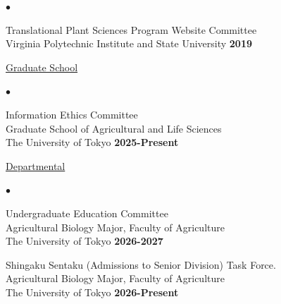 \documentclass[margin,line,10pt]{res}
\newenvironment{list2}{
  \begin{list}{$\bullet$}{%
      \setlength{\itemsep}{0in}
      \setlength{\parsep}{0in} \setlength{\parskip}{0in}
      \setlength{\topsep}{0in} \setlength{\partopsep}{0in} 
      \setlength{\leftmargin}{0.2in}}}{\end{list}}
\begin{document}
\begin{resume}
\begin{list2}
\item Translational Plant Sciences Program Website Committee \\
  Virginia Polytechnic Institute and State University  \hfill \textbf{2019}\\

  
\end{list2}

  
\begin{flushleft}
  \hspace{0.3cm} \underline{Graduate School}
\end{flushleft}
\begin{list2}

  \item  Information Ethics Committee   \\ %
  Graduate School of Agricultural and Life Sciences  \\ The University of Tokyo   \hfill \textbf{2025-Present}\\


\end{list2}
  

\begin{flushleft}
  \hspace{0.3cm} \underline{Departmental}
\end{flushleft}
\begin{list2}


  \item Undergraduate Education Committee \\ %
  Agricultural Biology Major, Faculty of Agriculture  \\ The University of Tokyo   \hfill \textbf{2026-2027}\\

  \vspace{0.3cm}


 
  \item  Shingaku Sentaku (Admissions to Senior Division) Task Force. \\ %
  Agricultural Biology Major, Faculty of Agriculture  \\ The University of Tokyo   \hfill \textbf{2026-Present}\\

  \vspace{0.3cm}




\end{list2}
\end{resume}
\end{document}
